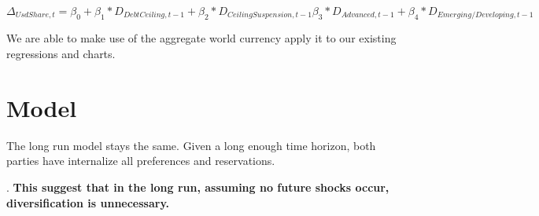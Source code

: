 \documentclass[12pt]{article}
\begin{document}
$$\Delta_{UsdShare,t}=\beta_0+\beta_1*D_{Debt Ceiling,t-1}+\beta_2*D_{CeilingSuspension,t-1}\beta_3 *D_{Advanced,t-1}+ \beta_4 *D_{Emerging/Developing,t-1}$$

We are able to make use of the aggregate world currency apply it to our existing regressions and charts. 



\section{Model 
\label{sec:Model}}
The long run model stays the same. Given a long enough time horizon, both parties have internalize all preferences and reservations. 
\setlength{\extrarowheight}{2pt}
\setlength{\extrarowheight}{2pt}
\begin{table}[htbp]
    \caption{Game Theory Table}
    \label{tab:game_theory}
\end{table} 


. \textbf{This suggest that in the long run, assuming no future shocks occur, diversification is unnecessary.} \\
\end{document}

